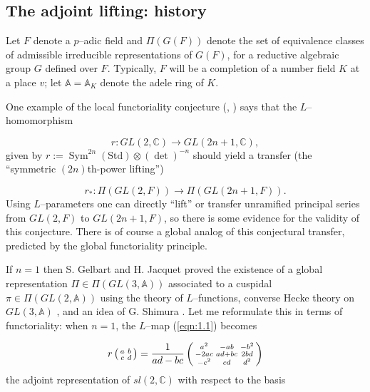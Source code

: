 \documentclass[12pt,letterpaper]{amsart}
\numberwithin{equation}{section}
\theoremstyle{definition}
\theoremstyle{plain}
\def\aaa{{\mathbb{A}}}
\def\ccc{\mathbb{C}}
\begin{document}
\subsection{The adjoint lifting: history}
\label{sec:1}

Let $F$ denote a $p$--adic field and $\Pi (G(F))$ denote the set of
equivalence classes of admissible irreducible representations of $G(F)$,
for a 
reductive algebraic group $G$ defined over $F$. 
Typically, $F$ will be a completion of a
number field $K$ at a place $v$; let $\aaa = \aaa_K$ denote the adele ring 
of $K$.
 
One example of the local functoriality conjecture (\cite{Bo79}, \cite{La80a})
says that the 
$L$--homomorphism

\begin{equation}
\label{eqn:1.1}
r : GL(2,\ccc ) \rightarrow GL(2n+1,\ccc ),
\end{equation}
given by $r := \operatorname{Sym}^{2n}(\mathrm{Std})\otimes (\det)^{-n}$ should 
yield a transfer (the ``symmetric $(2n)$th-power lifting'')

\begin{equation}
\label{eqn:1.2}
r_* : \Pi (GL(2,F)) \rightarrow \Pi (GL(2n+1,F)) .
\end{equation}
Using $L$--parameters one can directly ``lift'' or transfer unramified
principal series from $GL(2,F)$ to $GL(2n+1,F)$, so there is some evidence
for the validity of this conjecture. There is of course a global analog
of this conjectural transfer, predicted by the global functoriality
principle. 
 
If $n=1$ then S. Gelbart and H. Jacquet \cite{GJ78} proved the existence
of a global representation $\Pi \in \Pi (GL(3,\aaa ))$ associated
to a cuspidal $\pi \in \Pi (GL(2,\aaa ))$ using the theory of $L$--functions,
converse Hecke theory on $GL(3,\aaa )$ \cite{JPS79}, and an idea of
G. Shimura \cite{Sh75}. Let me reformulate this in terms of functoriality: 
when $n = 1$, the $L$--map (\ref{eqn:1.1}) becomes

\begin{equation}
\label{eqn:1.3}
r\left(\smallmatrix a&b \\ c&d \endsmallmatrix\right)
= {1\over{ad-bc}}\left(\smallmatrix a^2&-ab&-b^2 \\
-2ac&ad+bc&2bd\\
-c^2&cd&d^2 \endsmallmatrix\right)
\end{equation}
the adjoint representation of $sl(2,\ccc )$ with respect to the basis
\end{document}
